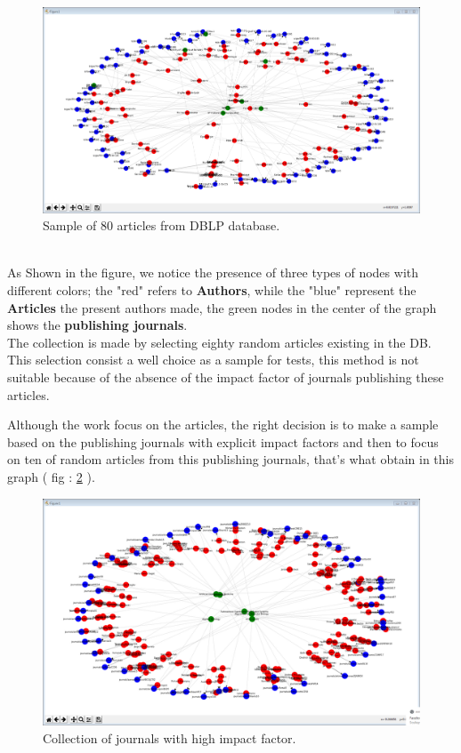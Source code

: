 \documentclass[times, twoside]{zHenriquesLab-StyleBioRxiv}
\begin{document}
\\
\begin{figure}[h]
\centering
\includegraphics[width=.8\linewidth]{Figures/Graph_1.png}
\caption{Sample of 80 articles from DBLP database.}
\label{fig:computerNo1}
\end{figure}
\\
As Shown in the figure, we notice the presence of three types of nodes with different colors; the "red" refers to \textbf{Authors}, while the "blue" represent the \textbf{Articles} the present authors made, the green nodes in the center of the graph shows the \textbf{publishing journals}.\\
The collection is made by selecting eighty random articles existing in the DB. This selection consist a well choice as a sample for tests, this method is not suitable because of the absence of the impact factor of journals publishing these articles.

Although the work focus on the articles, the right decision is to make a sample based on the publishing journals with explicit impact factors and then to focus on ten of random articles from this publishing journals, that's what obtain in this graph ( fig : \ref{fig:computerNo2} ).\\

\begin{figure}[h]
\centering
\includegraphics[width=.8\linewidth]{Figures/Graph_2.png}
\caption{Collection of journals with high impact factor.}
\label{fig:computerNo2}
\end{figure}
\end{document}
